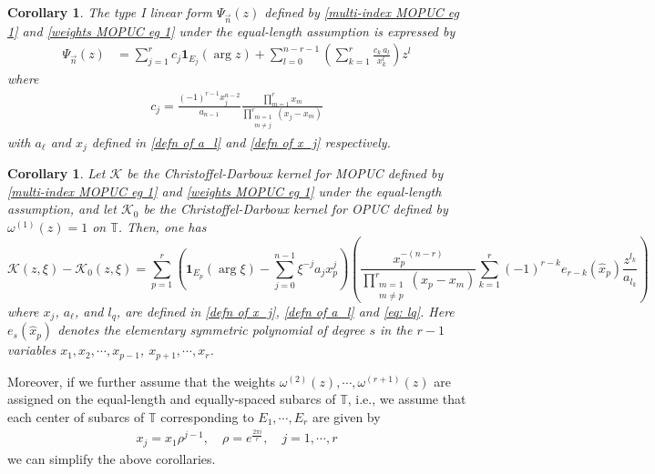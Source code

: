 \documentclass[a4paper,10pt,leqno]{amsart}
\numberwithin{equation}{section}
\newtheorem{corollary}[theorem]{Corollary}
\theoremstyle{remark}
\newcommand{\TT}{\mathbb{T}}
\begin{document}
\begin{corollary} \label{cor: MOPUC type I eg 1}
The type I linear form $\Psi_{\vec{n}}(z)$ defined by \eqref{multi-index MOPUC eg 1} and \eqref{weights MOPUC eg 1} under the equal-length assumption is expressed by
\begin{align} \label{MOPUC type I eg 1}
\Psi_{\vec{n}}(z) &= \sum_{j=1}^r c_j \mathbf{1}_{E_j}(\arg z) + \sum_{l=0}^{n-r-1} \left( \sum_{k=1}^r \frac{c_k \, a_{l}}{x_k^l} \right) z^l
\end{align}
where
\begin{align} \label{eg 1 defn of cj}
c_j = \frac{(-1)^{r-1} x_j^{n-2}}{a_{n-1}} \frac{\prod_{m=1}^r x_m}{\prod_{\substack{m=1 \\ m \neq j}}^r (x_j - x_m)}
\end{align}
with $a_\ell$ and $x_j$ defined in \eqref{defn of a_l} and \eqref{defn of x_j} respectively.
\end{corollary}

\begin{corollary} \label{cor: MOPUC kernel eg 1}
Let $\mathcal K$ be the Christoffel-Darboux kernel for MOPUC defined by \eqref{multi-index MOPUC eg 1} and \eqref{weights MOPUC eg 1} under the equal-length assumption, and let $\mathcal K_0$ be the Christoffel-Darboux kernel for OPUC defined by $\omega^{(1)}(z) = 1$ on $\TT$. Then, one has
\begin{equation} \label{MOPUC kernel eg 1}
    \mathcal K(z,\xi) - \mathcal K_0(z,\xi) = \sum_{p=1}^r \left( \mathbf{1}_{E_p} (\arg \xi) - \sum_{j=0}^{n-1} \xi^{-j} a_j x_p^j \right) \left( \frac{x_p^{-(n-r)}}{\prod_{\substack{m=1 \\ m \neq p}}^r (x_p - x_m)} \sum_{k=1}^r (-1)^{r-k} e_{r-k}(\hat{x}_p) \frac{z^{l_k}}{a_{l_k}}\right) 
\end{equation}
where $x_j$, $a_\ell$, and $l_q$, are defined in \eqref{defn of x_j}, \eqref{defn of a_l} and \eqref{eq: lq}. Here $e_s (\hat{x}_p)$ denotes the elementary symmetric polynomial of degree $s$ in the $r-1$ variables $x_1, x_2, \cdots, x_{p-1}$, $x_{p+1}, \cdots, x_r$.
\end{corollary}

Moreover, if we further assume that the weights $\omega^{(2)}(z), \cdots, \omega^{(r+1)}(z)$ are assigned on the equal-length and equally-spaced subarcs of $\mathbb T$, i.e., we assume that each center of subarcs of $\TT$ corresponding to $E_1, \cdots, E_r$ are given by
\begin{align} \label{equal space MOPUC eg 2}
x_j = x_1 \rho^{j-1}, \quad \rho = e^{\frac{2\pi i}{r}}, \quad j=1, \cdots, r
\end{align}
we can simplify the above corollaries.
\end{document}
